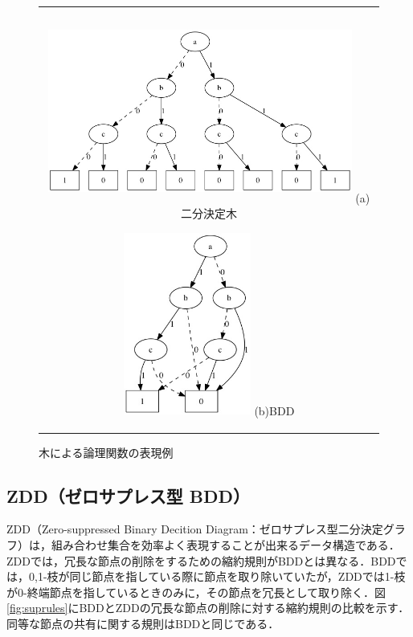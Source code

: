 \documentclass[12pt,twoside, fleqn]{ujbook}
\begin{document}
	\begin{figure}[htbp]
	\begin{center}
	\begin{tabular}{c}
		\begin{minipage}{0.66\hsize}
			\begin{center}
			\includegraphics [clip, width=10cm, height=6cm]{./img/sample.jpeg}
			\hspace{1.6cm} (a)二分決定木
			\end{center}
		\end{minipage}

		\begin{minipage}{0.33\hsize}
			\begin{center}
			\includegraphics [clip, height=6cm]{./img/bdd_sample.jpeg}
			\hspace{1.6cm} (b)BDD
			\end{center}
		\end{minipage}
	\end{tabular}
	\caption{木による論理関数の表現例}
	\label{fig:bt_bdd}
	\end{center}
	\end{figure}


\newpage
\subsection{ZDD（ゼロサプレス型 BDD）}
	ZDD（Zero-suppressed Binary Decition Diagram：ゼロサプレス型二分決定グラフ）\cite{Minato:1993:ZBS:157485.164890}は，組み合わせ集合を効率よく表現することが出来るデータ構造である．ZDDでは，冗長な節点の削除をするための縮約規則がBDDとは異なる．BDDでは，0,1-枝が同じ節点を指している際に節点を取り除いていたが，ZDDでは1-枝が0-終端節点を指しているときのみに，その節点を冗長として取り除く．図\ref{fig:suprules}にBDDとZDDの冗長な節点の削除に対する縮約規則の比較を示す．同等な節点の共有に関する規則はBDDと同じである．\\
\end{document}
